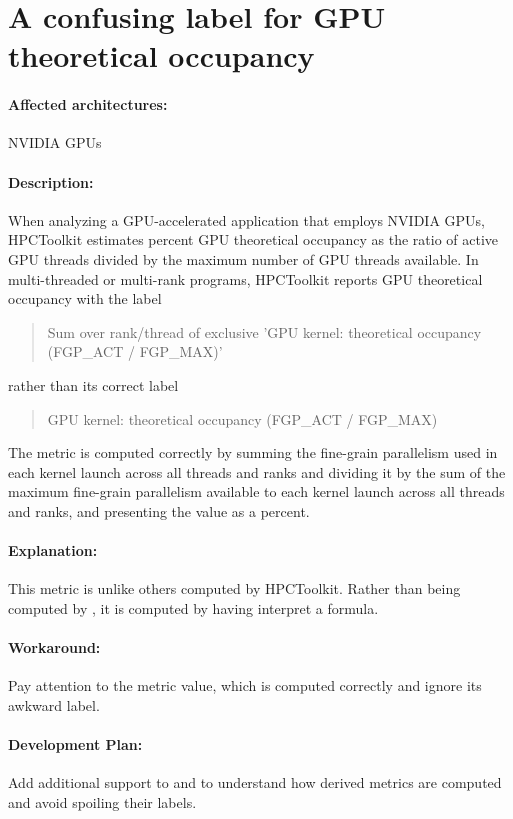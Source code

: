 \documentclass[11pt,twoside,letterpaper]{report}
\begin{document}
\section{A confusing label for GPU theoretical occupancy}
\paragraph{Affected architectures:}  NVIDIA GPUs

\paragraph{Description:} When analyzing a GPU-accelerated application that employs NVIDIA GPUs, HPCToolkit estimates percent GPU theoretical occupancy as the ratio of active GPU threads divided by the maximum number of GPU threads available. In multi-threaded or multi-rank programs, HPCToolkit reports GPU  theoretical occupancy with the label 

\begin{quote}
Sum over rank/thread of exclusive 'GPU kernel: theoretical occupancy (FGP\_ACT / FGP\_MAX)'
\end{quote}

\noindent rather than its correct label

\begin{quote}
GPU kernel: theoretical occupancy (FGP\_ACT / FGP\_MAX)
\end{quote}

The metric is computed correctly by summing the fine-grain parallelism used in each kernel launch across all threads and ranks and dividing it by the sum of the maximum fine-grain parallelism available to each kernel launch across all threads and ranks, and presenting the value as a percent.

\paragraph{Explanation:} This metric is unlike others computed by HPCToolkit. Rather than being computed by \hpcprof{}, it is computed by having \hpcviewer{} interpret a formula. 

\paragraph{Workaround:} Pay attention to the metric value, which is computed correctly and ignore its awkward label.


\paragraph{Development Plan:}  Add additional support to  \hpcrun{} and \hpcprof{} to understand how derived metrics are computed and avoid spoiling their labels.
\end{document}
